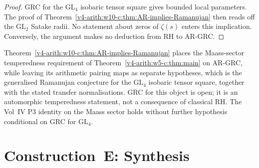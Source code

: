 \begin{proof}
GRC for the \(\mathrm{GL}_{4}\) isobaric tensor square gives bounded
local parameters. The proof of
Theorem~\ref{v4-arith:w10-c:thm:AR-implies-Ramanujan} then reads off the
\(\mathrm{GL}_{2}\) Satake radii. No statement about zeros of
\(\zeta(s)\) enters this implication. Conversely, the argument makes
no deduction from RH to AR-GRC.
\end{proof}

\begin{remark}
\label{v4-arith:w10-c:rem:sub-RH-meaning}
Theorem~\ref{v4-arith:w10-c:thm:AR-implies-Ramanujan} places the Maass-sector
temperedness requirement of Theorem~\ref{v4-arith:w5-c:thm:main} on AR-GRC,
while leaving its arithmetic pairing maps as separate hypotheses,
which is the generalised Ramanujan conjecture for the
\(\mathrm{GL}_{4}\) isobaric tensor square, together with the stated
transfer normalisations. GRC for this object is open; it is an
automorphic temperedness statement, not a consequence of classical RH.
The Vol~IV P3 identity on the Maass sector holds without further
hypothesis conditional on GRC for \(\mathrm{GL}_{4}\).
\end{remark}

\section{Construction~E: Synthesis}
\label{v4-arith:w10-c:construction-E}

